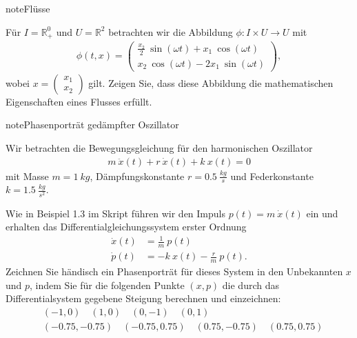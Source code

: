 \documentclass[letterpaper,10pt,german]{jupyterBook}
\begin{document}
\begin{sphinxadmonition}{note}{Flüsse}

\sphinxAtStartPar
Für \(I = \mathbb{R}^0_+\) und \(U = \mathbb{R}^2\) betrachten wir die Abbildung \(\phi: I \times U \rightarrow U\) mit
\begin{equation*}
\begin{split}\phi(t, x) = 
\begin{pmatrix} \frac{x_2}{2} ~ \sin(\omega t) + x_1 ~ \cos(\omega t) \\ x_2 ~ \cos(\omega t) - 2 x_1 ~ \sin(\omega t) \end{pmatrix}, \end{split}
\end{equation*}
\sphinxAtStartPar
wobei \(x = \begin{pmatrix} x_1 \\ x_2 \end{pmatrix}\) gilt.
Zeigen Sie, dass diese Abbildung die mathematischen Eigenschaften eines Flusses erfüllt.
\end{sphinxadmonition}

\begin{sphinxadmonition}{note}{Phasenporträt gedämpfter Oszillator}

\sphinxAtStartPar
Wir betrachten die Bewegungsgleichung für den harmonischen Oszillator
\begin{equation*}
\begin{split}m ~ \ddot x(t) + r ~ \dot x(t) + k ~ x(t) = 0\end{split}
\end{equation*}
\sphinxAtStartPar
mit Masse \(m = 1  ~ kg\), Dämpfungskonstante \(r = 0.5 ~ \frac{kg}{s}\) und Federkonstante \(k = 1.5 ~ \frac{kg}{s^2}\).

\sphinxAtStartPar
Wie in Beispiel 1.3 im Skript führen wir den Impuls \(p(t) = m ~ \dot x(t)\) ein und erhalten das Differentialgleichungssystem erster Ordnung
\begin{equation*}
\begin{split}\dot x(t) &= \frac{1}{m} ~ p(t)\\
\dot p(t) &= -k ~ x(t) - \frac{r}{m} ~ p(t).\end{split}
\end{equation*}
\sphinxAtStartPar
Zeichnen Sie händisch ein Phasenporträt für dieses System in den Unbekannten \(x\) und \(p\), indem Sie für die folgenden Punkte \((x,p)\) die durch das Differentialsystem gegebene Steigung berechnen und einzeichnen:
\begin{equation*}
\begin{split}&(-1, 0) \quad  (1, 0) \quad (0, -1) \quad  (0, 1)\\
&(-0.75, -0.75) \quad  (-0.75, 0.75) \quad (0.75, -0.75) \quad (0.75, 0.75)\end{split}
\end{equation*}\end{sphinxadmonition}
\end{document}
